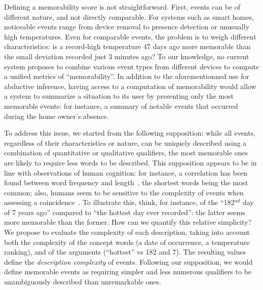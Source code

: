 \documentclass[entropy,article,submit,moreauthors,pdftex]{Definitions/mdpi}
\begin{document}
Defining a memorability score is not straightforward. First, events can be of different nature, and not directly
comparable. For systems such as smart homes, noticeable events
range from device removal to presence detection or unusually high
temperatures. Even for comparable events, the problem is to weigh different characteristics: is a record-high temperature 47 days
ago more memorable than the small deviation recorded just 3 minutes ago? To
our knowledge, no current system proposes to combine various
event types from different devices to compute a unified metrics of
``memorability''. 
In addition to the aforementionned use for abductive inference, having access to a computation of memorability would allow a system to summarize a situation to its user by presenting only the most memorable events: for instance, a summary of notable events that occurred during the home owner's absence.

To address this issue, we started from the following supposition: while all
events, regardless of their characteristics or nature, can be uniquely
described using a combination of quantitative or qualitative qualifiers, the most memorable ones are
likely to require less words to be described. This supposition appears to be in line with observations of human cognition: for instance, a correlation has been found between word frequency and length~\cite{strauss_word_2007}, the shortest words being the most common; also, humans seem to be sensitive to the complexity of events when assessing a coincidence~\cite{griffiths_probability_2003,dessalles_coincidences_2011}. To illustrate this, think, for instance, of the ``182$^{nd}$ day of 7 years ago'' compared to ``the hottest day ever recorded'': the latter seems more memorable than the former. How can we quantify this relative simplicity? We propose to evaluate the complexity of each
description, taking into account both the complexity of the concept words (a date
of occurrence, a temperature ranking), and of the arguments (``hottest'' vs
182 and 7). The resulting values define the  \emph{description complexity}
of events. Following our supposition, we would define memorable events as requiring simpler and less numerous qualifiers to be unambiguously described than unremarkable ones.
\end{document}
